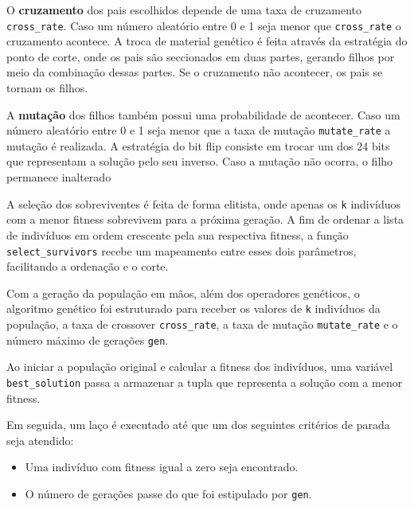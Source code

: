 

O \textbf{cruzamento} dos pais escolhidos depende de uma taxa de cruzamento \verb*|cross_rate|. Caso um número aleatório entre 0 e 1 seja menor que \verb*|cross_rate| o cruzamento acontece. A troca de material genético é feita através da estratégia do ponto de corte, onde os pais são seccionados em duas partes, gerando filhos por meio da combinação dessas partes. Se o cruzamento não acontecer, os pais se tornam os filhos.



A \textbf{mutação} dos filhos também possui uma probabilidade de acontecer. Caso um número aleatório entre 0 e 1 seja menor que a taxa de mutação \verb*|mutate_rate| a mutação é realizada. A estratégia do bit flip consiste em trocar um dos 24 bits que representam a solução pelo seu inverso. Caso a mutação não ocorra, o filho permanece inalterado



A seleção dos sobreviventes é feita de forma elitista, onde apenas os \verb*|k| indivíduos com a menor fitness sobrevivem para a próxima geração. A fim de ordenar a lista de indivíduos em ordem crescente pela sua respectiva fitness, a função \verb*|select_survivors| recebe um mapeamento entre esses dois parâmetros, facilitando a ordenação e o corte.



Com a geração da população em mãos, além dos operadores genéticos, o algoritmo genético foi estruturado para receber os valores de \verb*|k| indivíduos da população, a taxa de crossover \verb*|cross_rate|, a taxa de mutação \verb*|mutate_rate| e o número máximo de gerações \verb*|gen|.

Ao iniciar a população original e calcular a fitness dos indivíduos, uma variável \verb*|best_solution| passa a armazenar a tupla que representa a solução com a menor fitness.

Em seguida, um laço é executado até que um dos seguintes critérios de parada seja atendido:
\begin{itemize}
	\item Uma indivíduo com fitness igual a zero seja encontrado.
	\item O número de gerações passe do que foi estipulado por \verb*|gen|.
\end{itemize}

